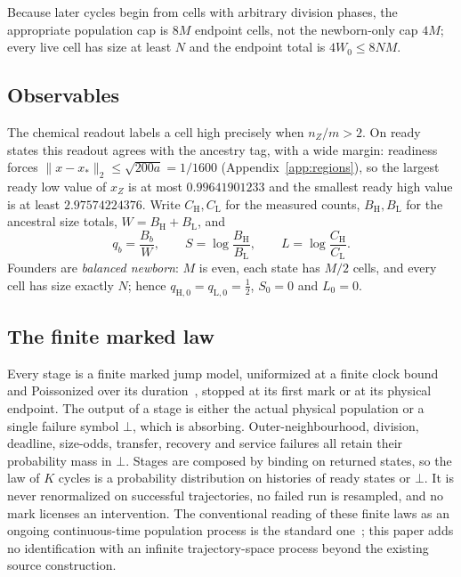\documentclass[11pt,a4paper]{article}
\theoremstyle{plain}
\theoremstyle{definition}
\theoremstyle{remark}
\newcommand{\lo}{\mathrm L}
\newcommand{\hi}{\mathrm H}
\newcommand{\fail}{\bot}
\begin{document}
Because later cycles begin from cells with arbitrary division phases, the
appropriate population cap is $8M$ endpoint cells, not the newborn-only cap
$4M$; every live cell has size at least $N$ and the endpoint total is
$4W_0\le8NM$.

\subsection{Observables}\label{sec:observables}

The chemical readout labels a cell high precisely when $n_Z/m>2$. On ready
states this readout agrees with the ancestry tag, with a wide margin: readiness
forces $\|x-x_*\|_2\le\sqrt{200a}=1/1600$ (Appendix~\ref{app:regions}), so the
largest ready low value of $x_Z$ is at most $0.99641901233$ and the smallest
ready high value is at least $2.97574224376$. Write $C_\hi,C_\lo$ for the
measured counts, $B_\hi,B_\lo$ for the ancestral size totals, $W=B_\hi+B_\lo$,
and
\begin{equation}\label{eq:obs}
q_b=\frac{B_b}{W},\qquad S=\log\frac{B_\hi}{B_\lo},\qquad
L=\log\frac{C_\hi}{C_\lo}.
\end{equation}
Founders are \emph{balanced newborn}: $M$ is even, each state has $M/2$ cells,
and every cell has size exactly $N$; hence $q_{\hi,0}=q_{\lo,0}=\frac12$,
$S_0=0$ and $L_0=0$.

\subsection{The finite marked law}\label{sec:law}

Every stage is a finite marked jump model, uniformized at a finite clock bound
and Poissonized over its duration~\citep{jensen1953,norris1997}, stopped at its
first mark or at its physical endpoint. The output of a stage is either the
actual physical population or a single failure symbol $\fail$, which is
absorbing. Outer-neighbourhood, division, deadline, size-odds, transfer,
recovery and service failures all retain their probability mass in $\fail$.
Stages are composed by binding on returned states, so the law of $K$ cycles is
a probability distribution on histories of ready states or $\fail$. It is never
renormalized on successful trajectories, no failed run is resampled, and no
mark licenses an intervention. The conventional reading of these finite laws as
an ongoing continuous-time population process is the standard
one~\citep{kurtz1972,gillespie1977,andersonkurtz2015}; this paper adds no
identification with an infinite trajectory-space process beyond the existing
source construction.
\end{document}
